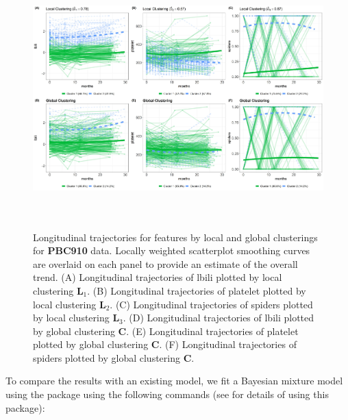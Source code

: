 \begin{figure}[h]
\centering
\includegraphics[width=\textwidth,height=10cm]{./Figures/trajplot_PBC910.JPEG}
\caption{\label{fig:traj} Longitudinal trajectories for features by local and global clusterings for \textbf{PBC910} data. Locally weighted scatterplot smoothing curves are overlaid on each panel to provide an estimate of the overall trend.  (A) Longitudinal trajectories of lbili plotted by local clustering $\boldsymbol{L}_1$. (B) Longitudinal trajectories of platelet plotted by local clustering $\boldsymbol{L}_2$. (C) Longitudinal trajectories of spiders plotted by local clustering $\boldsymbol{L}_3$. (D) Longitudinal trajectories of lbili plotted by global clustering $\boldsymbol{C}$. (E)  Longitudinal trajectories of platelet plotted by global clustering $\boldsymbol{C}$. (F)  Longitudinal trajectories of spiders plotted by global clustering $\boldsymbol{C}$.}
\end{figure}

To compare the results with an existing model, we fit a Bayesian mixture model using the  package using the following commands (see \citep{Komarek2014} for details of using this package): 

